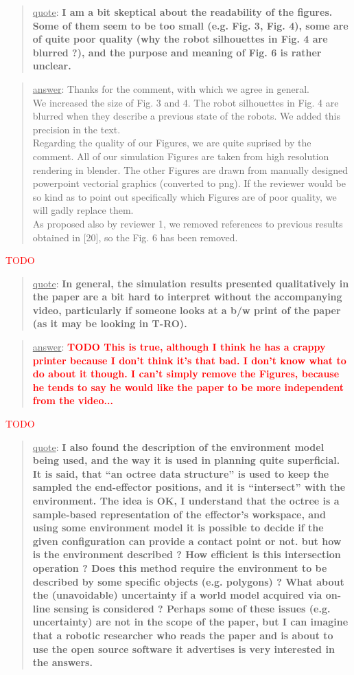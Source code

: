 \documentclass[a4paper]{article}
\newcommand{\ndone}[0]{\textcolor{red}{TODO}}
\newcommand\quot[1]{\begin{quote} \underline{quote}: \textbf{#1}\end{quote}}
\newcommand\as[1]{\begin{quote} \underline{answer}: {#1}\end{quote} }
\begin{document}
\quot{I am a bit skeptical about the readability of the figures. Some of them seem to be too small (e.g. Fig. 3, Fig. 4), some are of quite poor quality (why the robot silhouettes in Fig. 4 are blurred ?), and the purpose and meaning of Fig. 6 is rather unclear.}
\as{Thanks for the comment, with which we agree in general.  \\We increased the size of Fig. 3 and 4. The robot silhouettes in Fig. 4 are blurred when they describe a previous state of the robots. We added this precision in the text. \\Regarding the quality of our Figures, we are quite suprised by the comment. All of our simulation Figures are taken from high resolution rendering in blender. The other Figures are drawn from manually designed powerpoint vectorial graphics (converted to png). If the reviewer would be so kind as to point out specifically which Figures are of poor quality, we will gadly replace them.\\ As proposed also by reviewer 1, we removed references to previous results obtained in [20], so the Fig. 6 has been removed.}\ndone

\quot{In general, the simulation results presented qualitatively in the paper are a bit hard to interpret without the accompanying video, particularly if someone looks at a b/w print of the paper (as it may be looking in T-RO).}
\as{\textbf{\textcolor{red}{TODO This is true, although I think he has a crappy printer because I don't think it's that bad. I don't know what to do about it though. I can't simply remove the Figures,
because he tends to say he would like the paper to be more independent from the video...}}}\ndone


\quot{ I also found the description of the environment model being
used,
and the way it is used in planning quite superficial. It is said, that
``an octree data structure'' is used to keep the sampled the
end-effector positions, and it is ``intersect'' with the environment.
The idea is OK, I understand that the octree is a sample-based
representation of the effector's workspace, and using some environment
model it is possible to decide if the given configuration can provide a
contact point or not. but how is the environment described ? How
efficient is this intersection operation ? Does this method require the
environment to be described by some specific objects (e.g. polygons) ?
What about the (unavoidable) uncertainty if a world model acquired via
on-line sensing is considered ? Perhaps some of these issues (e.g.
uncertainty) are not in the scope of the paper, but I can imagine that
a robotic researcher who reads the paper and is about to use the open
source software it advertises is very interested in the answers.}
\end{document}
